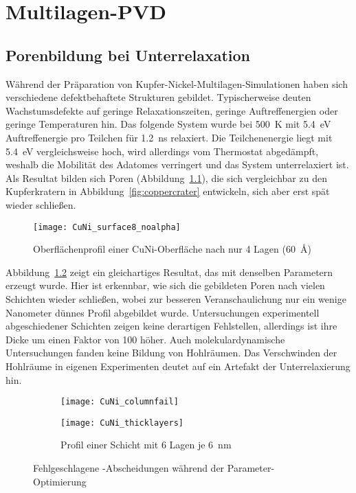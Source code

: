 \chapter{Multilagen-PVD}
\label{appendix_multilayer}

\section{Porenbildung bei Unterrelaxation}

Während der Präparation von Kupfer-Nickel-Multilagen-Simulationen haben sich verschiedene defektbehaftete Strukturen gebildet.
Typischerweise deuten Wachstumsdefekte auf geringe Relaxationszeiten, geringe Auftreffenergien oder geringe Temperaturen hin.
Das folgende System wurde bei \SI{500}{\kelvin} mit \SI{5.4}{\electronvolt} Auftreffenergie pro Teilchen für \SI{1.2}{\nano\second} relaxiert.
Die Teilchenenergie liegt mit \SI{5.4}{\electronvolt} vergleichsweise hoch\cite{zhou_atomistic_1998}, wird allerdings vom Thermostat abgedämpft, weshalb die Mobilität des Adatomes verringert und das System unterrelaxiert ist.
Als Resultat bilden sich Poren (Abbildung~\ref{fig:multilayer_surfacefail}), die sich vergleichbar zu den Kupferkratern in Abbildung~\ref{fig:coppercrater} entwickeln, sich aber erst spät wieder schließen.

\begin{figure}[!h]
  \centering
  \texttt{[image: CuNi\_surface8\_noalpha]}
  \caption{Oberflächenprofil einer CuNi-Oberfläche nach nur 4 Lagen (\SI{60}{\angstrom})}
  \label{fig:multilayer_surfacefail}
\end{figure}

Abbildung~\ref{fig:multilayer_columnfail} zeigt ein gleichartiges Resultat, das mit denselben Parametern erzeugt wurde.
Hier ist erkennbar, wie sich die gebildeten Poren nach vielen Schichten wieder schließen, wobei zur besseren Veranschaulichung nur ein wenige Nanometer dünnes Profil abgebildet wurde.
Untersuchungen experimentell abgeschiedener Schichten zeigen keine derartigen Fehlstellen\cite{yang_pulsed_1995}, allerdings ist ihre Dicke um einen Faktor von \num{100} höher.
Auch molekulardynamische Untersuchungen\cite{zhou_atomic_2001} fanden keine Bildung von Hohlräumen.
Das Verschwinden der Hohlräume in eigenen Experimenten deutet auf ein Artefakt der Unterrelaxierung hin.

\begin{figure}[!ht]
  \captionsetup[subfigure]{singlelinecheck=false}
  \def\subfigwidth{7cm}
  \begin{subfigure}[t]{\subfigwidth}
    \texttt{[image: CuNi\_columnfail]}
    \label{fig:multilayer_columnfail}
  \end{subfigure}
  \hfill
  \begin{subfigure}[t]{\subfigwidth}
    \texttt{[image: CuNi\_thicklayers]}
    \caption{Profil einer Schicht mit 6 Lagen je \SI{6}{\nano\meter}}
    \label{fig:multilayer_thickfail}
  \end{subfigure}
  \caption{Fehlgeschlagene -Abscheidungen während der Parameter-Optimierung}
\end{figure}


